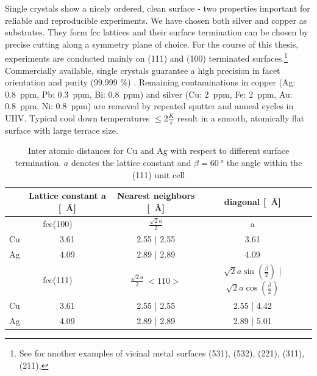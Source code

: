 Single crystals show a nicely ordered, clean surface - two properties important for reliable and reproducible experiments. We have chosen both silver and copper as substrates. They form fcc lattices and their surface termination can be chosen by precise cutting along a symmetry plane of choice. For the course of this thesis, experiments are conducted mainly on (111) and (100) terminated surfaces.\footnote{See \cite{riemann_ionic_2002} for another examples of vicinal metal surfaces (531), (532), (221), (311), (211).} Commercially available, single crystals guarantee a high precision in facet orientation and purity (99.999 \%) \cite{mateck}. Remaining contaminations in copper (Ag: \SI{0.8}{ppm}, Pb: \SI{0.3}{ppm}, Bi: \SI{0.8}{ppm}) and silver (Cu: \SI{2}{ppm}, Fe: \SI{2}{ppm}, Au: \SI{0.8}{ppm}, Ni: \SI{0.8}{ppm}) are removed by repeated sputter and anneal cycles in UHV. Typical cool down temperatures $\leq 2 \frac{K}{s}$ result in a smooth, atomically flat surface with large terrace size.

\begin{table}
\centering
\caption{Inter atomic distances for Cu and Ag with respect to different surface termination. $a$ denotes the lattice constant and $\beta= \SI{60}{\degree}$ the angle within the (111) unit cell}
  \begin{tabular}{ccccc}
& Lattice constant a [\SI{}{\angstrom}] & Nearest neighbors [\SI{}{\angstrom}] & diagonal [\SI{}{\angstrom}]\\ \hline 
\multicolumn{2}{c}{fcc(100)} & $\frac{\sqrt{2}a}{2}$ & a \\
  Cu	 	& 3.61	& 2.55 | 2.55 & 3.61  \\
  Ag		& 4.09	& 2.89 | 2.89 & 4.09 \\ \hline 
\multicolumn{2}{c}{fcc(111)} & $\frac{\sqrt{2}a}{2} \ <110>$ & $\sqrt{2}a\sin(\frac{\beta}{2})$ | $\sqrt{2}a\cos(\frac{\beta}{2})$\\
Cu 		& 3.61	& 2.55 | 2.55	& 2.55 | 4.42 \\
Ag		& 4.09	& 2.89 | 2.89	& 2.89 | 5.01 \\ \hline
%
 \end{tabular}
\end{table}

